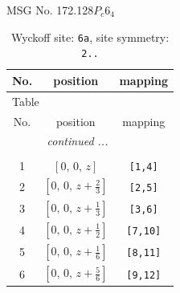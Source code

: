 \documentclass[fleqn,8pt]{jsarticle}
\begin{document}
\setcounter{MaxMatrixCols}{32}

\renewcommand{\tablename}{Table~}
\renewcommand{\figurename}{Figure~}
\begin{center}
\LARGE
MSG No. 172.128\quad$P_{c}6_{4}$
\end{center}
\renewcommand{\arraystretch}{1.2}
\begin{longtable}{ccc}
\caption{Wyckoff site: {\tt 6a}, site symmetry: {\tt 2..}}
 \\
 \hline \hline
No. & position & mapping \\ \hline \endfirsthead

\multicolumn{2}{l}{\tablename\ \thetable{}} \\
 \hline \hline
No. & position & mapping \\ \hline \endhead

 \hline \hline
\multicolumn{2}{r}{\footnotesize\it continued ...} \\ \endfoot

 \hline \hline
\multicolumn{2}{r}{} \\ \endlastfoot

1 & $\left[ 0,\, 0,\, z \right]$ & {\tt [1,4]} \\ \hline
2 & $\left[ 0,\, 0,\, z + \frac{2}{3} \right]$ & {\tt [2,5]} \\ \hline
3 & $\left[ 0,\, 0,\, z + \frac{1}{3} \right]$ & {\tt [3,6]} \\ \hline
4 & $\left[ 0,\, 0,\, z + \frac{1}{2} \right]$ & {\tt [7,10]} \\ \hline
5 & $\left[ 0,\, 0,\, z + \frac{1}{6} \right]$ & {\tt [8,11]} \\ \hline
6 & $\left[ 0,\, 0,\, z + \frac{5}{6} \right]$ & {\tt [9,12]} \\
\end{longtable}
\renewcommand{\arraystretch}{1.2}
\end{document}
